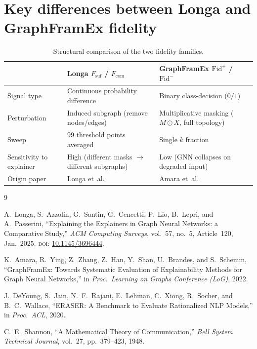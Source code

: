 \documentclass[11pt,a4paper]{article}
\begin{document}
\section{Key differences between Longa and GraphFramEx fidelity}
\label{sec:comparison}

\begin{table}[ht]
\centering
\footnotesize
\begin{tabular}{@{}lll@{}}
\toprule
& \textbf{Longa $F_{\mathrm{suf}}$ / $F_{\mathrm{com}}$}
& \textbf{GraphFramEx $\mathrm{Fid}^+$ / $\mathrm{Fid}^-$} \\
\midrule
Signal type
  & Continuous probability difference
  & Binary class-decision ($0/1$) \\
Perturbation
  & Induced subgraph (remove nodes/edges)
  & Multiplicative masking ($M \odot X$, full topology) \\
Sweep
  & 99 threshold points averaged
  & Single $k$ fraction \\
Sensitivity to explainer
  & High (different masks $\to$ different subgraphs)
  & Low (GNN collapses on degraded input) \\
Origin paper
  & Longa et~al.~\cite{longa2025}
  & Amara et~al.~\cite{amara2022graphframex} \\
\bottomrule
\end{tabular}
\caption{Structural comparison of the two fidelity families.}
\label{tab:comparison}
\end{table}


\begin{thebibliography}{9}

A.~Longa, S.~Azzolin, G.~Santin, G.~Cencetti, P.~Lio, B.~Lepri, and
A.~Passerini,
``Explaining the Explainers in Graph Neural Networks: a Comparative Study,''
\emph{ACM Computing Surveys}, vol.~57, no.~5, Article~120, Jan.~2025.
\textsc{doi}: \href{https://doi.org/10.1145/3696444}{10.1145/3696444}.

K.~Amara, R.~Ying, Z.~Zhang, Z.~Han, Y.~Shan, U.~Brandes, and S.~Schemm,
``GraphFramEx: Towards Systematic Evaluation of Explainability Methods for
Graph Neural Networks,''
in \emph{Proc.\ Learning on Graphs Conference (LoG)}, 2022.

J.~DeYoung, S.~Jain, N.~F.~Rajani, E.~Lehman, C.~Xiong, R.~Socher, and
B.~C.~Wallace,
``ERASER: A Benchmark to Evaluate Rationalized NLP Models,''
in \emph{Proc.\ ACL}, 2020.

C.~E.~Shannon,
``A Mathematical Theory of Communication,''
\emph{Bell System Technical Journal}, vol.~27, pp.~379--423, 1948.

\end{thebibliography}
\end{document}
